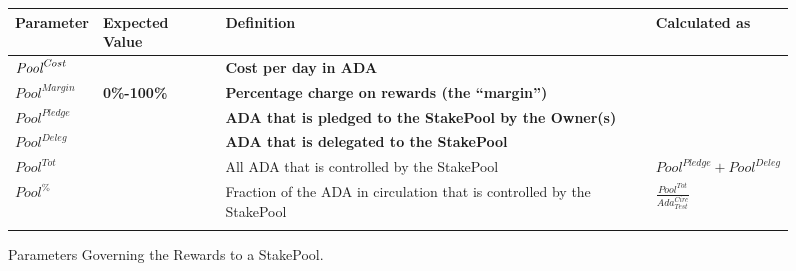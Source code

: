 \documentclass[11pt,a4paper,dvipsnames,twosided,final]{article}
\newcommand{\ada}{ADA{}}
\begin{document}
\begin{figure}[h!]
\begin{center}
\begin{tabular}{||l|l|p{6cm}|l||}
  \hline \hline
\textbf{Parameter} & \textbf{Expected Value} & \textbf{Definition} & \textbf{Calculated as} \\\hline
  \textbf{\color{red} $\textit{\textit{Pool}}^{\textit{Cost}}$} &  & \textbf{\color{red} Cost per day in \ada{}} & \\\hline
\textbf{\color{red} ${\textit{Pool}}^{\textit{Margin}}$} &  \textbf{\color{red} 0\%-100\%} & \textbf{\color{red} Percentage charge on rewards (the ``margin'')} & \\\hline
\textbf{\color{red} ${\textit{Pool}}^\textit{Pledge}$} & & \textbf{\color{red} \ada{} that is pledged to the StakePool by the Owner(s)} & \\\hline
\textbf{\color{blue} ${\textit{Pool}}^\textit{Deleg}$} & & \textbf{\color{blue} \ada{} that is delegated to the StakePool} & \\\hline
${\textit{Pool}}^{Tot}$ & & All \ada{} that is controlled by the StakePool & ${\textit{Pool}}^\textit{Pledge} + {\textit{Pool}}^\textit{Deleg}$ \\\hline
  ${\textit{Pool}}^\%$ & & Fraction of the \ada{} in circulation that is controlled by the StakePool & {\large $\frac{{\textit{Pool}}^{Tot}}{\textit{Ada}^{\textit{Circ}}_{\textit{Test}}}$} \\\hline
&&&  \\\hline
\hline
\end{tabular}
\end{center}
\caption{Parameters Governing the Rewards to a StakePool.}
\label{fig:rewards}
\end{figure}
\end{document}
